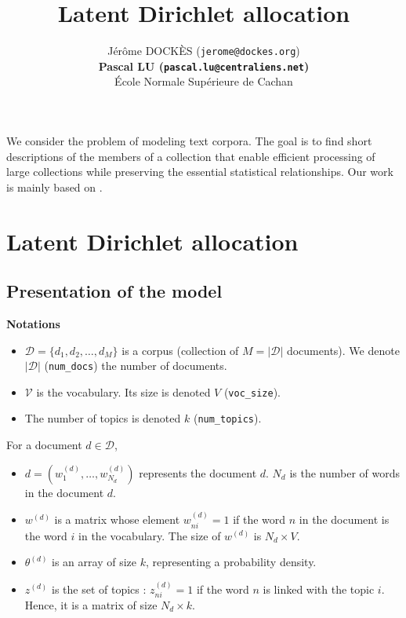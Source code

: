\documentclass{article}
\title{Latent Dirichlet allocation}
\author{
J\'er\^ome DOCK\`ES (\texttt{jerome@dockes.org}) \\
\textbf{Pascal LU (\texttt{pascal.lu@centraliens.net})} \\
\'Ecole Normale Sup\'erieure de Cachan \\
}
\begin{document}
\maketitle

We consider the problem of modeling text corpora. The goal is to find short descriptions of the members of a collection that enable efficient processing of large collections while preserving the essential statistical relationships. Our work is mainly based on \cite{BNJ03}.

\section{Latent Dirichlet allocation}
\subsection{Presentation of the model}

\textbf{Notations}
\begin{itemize}
\setlength\itemsep{-0.2em}
  \item $\mathcal{D} = \{d_{1},d_{2}, \ldots, d_{M}\}$ is a corpus (collection of $M=|\mathcal{D}|$ documents). We denote $|\mathcal{D}|$ (\verb"num_docs") the number of documents.
  \item $\mathcal{V}$ is the vocabulary. Its size is denoted $V$ (\verb"voc_size").
  \item The number of topics is denoted $k$ (\verb"num_topics").
\end{itemize}

For a document $d \in \mathcal{D}$,
\begin{itemize}  
\setlength\itemsep{-0.2em}
  \item $d = (w_1^{(d)}, \ldots, w_{N_d}^{(d)})$ represents the document $d$. $N_d$ is the number of words in the document $d$.
  \item $w^{(d)}$ is a matrix whose element $w_{ni}^{(d)} = 1$ if the word $n$ in the 
document is the word $i$ in the vocabulary. The size of $w^{(d)}$ is $N_d \times V$.
  
 \item $\theta^{(d)}$ is an array of size $k$, representing a probability density.
 \item $z^{(d)}$ is the set of topics : $z_{ni}^{(d)} =  1$ if the word $n$ is linked with the topic $i$. Hence, it is a matrix of size $N_d \times k$.
\end{itemize}
\end{document}
